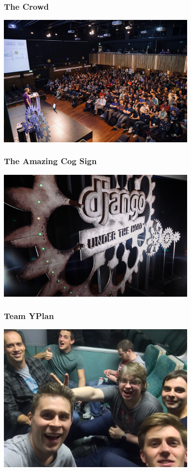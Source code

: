 \documentclass{beamer}
\begin{document}
\begin{frame}[fragile]\frametitle{The Crowd}

    \begin{center}
        \includegraphics[width=10cm]{duth-attendees}
    \end{center}

\end{frame}


\begin{frame}[fragile]\frametitle{The Amazing Cog Sign}

    \begin{center}
        \includegraphics[width=10cm]{duth-sign}
    \end{center}

\end{frame}


\begin{frame}[fragile]\frametitle{Team YPlan}

    \begin{center}
        \includegraphics[width=10cm]{yplan-team}
    \end{center}

\end{frame}
\end{document}
